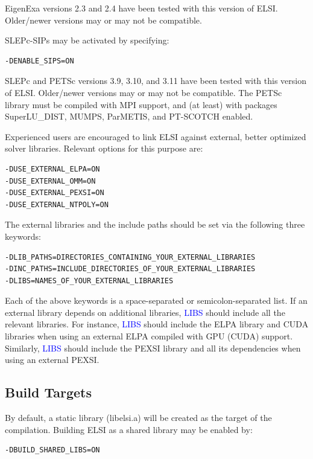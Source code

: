 \documentclass{report}
\begin{document}
EigenExa versions 2.3 and 2.4 have been tested with this version of ELSI. Older/newer versions may or may not be compatible.

SLEPc-SIPs may be activated by specifying:
\begin{tcolorbox}
\begin{verbatim}
-DENABLE_SIPS=ON
\end{verbatim}
\end{tcolorbox}

SLEPc and PETSc versions 3.9, 3.10, and 3.11 have been tested with this version of ELSI. Older/newer versions may or may not be compatible. The PETSc library must be compiled with MPI support, and (at least) with packages SuperLU\_DIST, MUMPS, ParMETIS, and PT-SCOTCH enabled.

Experienced users are encouraged to link ELSI against external, better optimized solver libraries. Relevant options for this purpose are:
\begin{tcolorbox}
\begin{verbatim}
-DUSE_EXTERNAL_ELPA=ON
-DUSE_EXTERNAL_OMM=ON
-DUSE_EXTERNAL_PEXSI=ON
-DUSE_EXTERNAL_NTPOLY=ON
\end{verbatim}
\end{tcolorbox}

The external libraries and the include paths should be set via the following three keywords:
\begin{tcolorbox}
\begin{verbatim}
-DLIB_PATHS=DIRECTORIES_CONTAINING_YOUR_EXTERNAL_LIBRARIES
-DINC_PATHS=INCLUDE_DIRECTORIES_OF_YOUR_EXTERNAL_LIBRARIES
-DLIBS=NAMES_OF_YOUR_EXTERNAL_LIBRARIES
\end{verbatim}
\end{tcolorbox}

Each of the above keywords is a space-separated or semicolon-separated list. If an external library depends on additional libraries, \textcolor{blue}{LIBS} should include all the relevant libraries. For instance, \textcolor{blue}{LIBS} should include the ELPA library and CUDA libraries when using an external ELPA compiled with GPU (CUDA) support. Similarly, \textcolor{blue}{LIBS} should include the PEXSI library and all its dependencies when using an external PEXSI.

\subsection{Build Targets}
\label{subsec:config_targets}
By default, a static library (libelsi.a) will be created as the target of the compilation. Building ELSI as a shared library may be enabled by:
\begin{tcolorbox}
\begin{verbatim}
-DBUILD_SHARED_LIBS=ON
\end{verbatim}
\end{tcolorbox}
\end{document}

